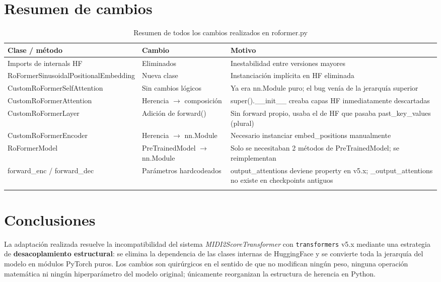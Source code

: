 \documentclass[12pt,a4paper]{article}
\begin{document}
\section{Resumen de cambios}

\begin{longtable}{>{\ttfamily\small}p{5.2cm}
                  >{\small}p{3.5cm}
                  >{\small}p{5.8cm}}
\toprule
\textbf{Clase / método} & \textbf{Cambio} & \textbf{Motivo} \\
\midrule
\endhead
Imports de internals HF & Eliminados & Inestabilidad entre versiones mayores \\
\addlinespace
RoFormerSinusoidal\-Positional\-Embedding & Nueva clase & Instanciación
  implícita en HF eliminada \\
\addlinespace
CustomRoFormerSelf\-Attention & Sin cambios lógicos & Ya era nn.Module puro;
  el bug venía de la jerarquía superior \\
\addlinespace
CustomRoFormerAttention & Herencia $\to$ composición & super().\_\_init\_\_
  creaba capas HF inmediatamente descartadas \\
\addlinespace
CustomRoFormerLayer & Adición de forward() & Sin forward propio, usaba el de
  HF que pasaba past\_key\_values (plural) \\
\addlinespace
CustomRoFormerEncoder & Herencia $\to$ nn.Module & Necesario instanciar
  embed\_positions manualmente \\
\addlinespace
RoFormerModel & PreTrainedModel $\to$ nn.Module & Solo se necesitaban 2
  métodos de PreTrainedModel; se reimplementan \\
\addlinespace
forward\_enc / forward\_dec & Parámetros hardcodeados & output\_attentions
  deviene property en v5.x; \_output\_attentions no existe en checkpoints
  antiguos \\
\bottomrule
\caption{Resumen de todos los cambios realizados en roformer.py}
\end{longtable}

\section{Conclusiones}

La adaptación realizada resuelve la incompatibilidad del sistema
\textit{MIDI2ScoreTransformer} con \texttt{transformers} v5.x mediante una estrategia
de \textbf{desacoplamiento estructural}: se elimina la dependencia de las clases
internas de HuggingFace y se convierte toda la jerarquía del modelo en módulos PyTorch
puros. Los cambios son quirúrgicos en el sentido de que no modifican ningún peso,
ninguna operación matemática ni ningún hiperparámetro del modelo original; únicamente
reorganizan la estructura de herencia en Python.
\end{document}
